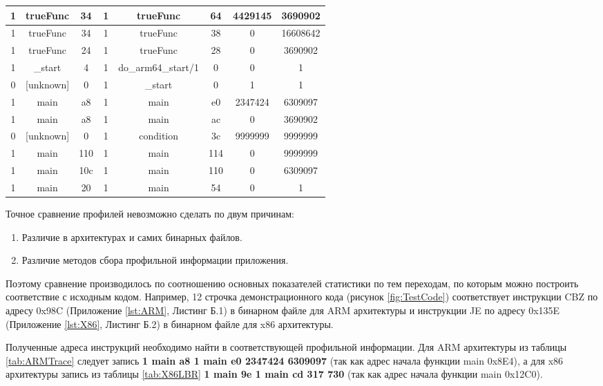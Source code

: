 \begin{table} [h]
\begin{threeparttable}
\begin{SingleSpace}
\begin{tabular}{| c | c | c | c | c | c | c | c |}
				1& trueFunc& 34& 1& trueFunc& 64& 4429145& 3690902 \\ \hline
				1& trueFunc& 34& 1& trueFunc& 38& 0& 16608642 \\ \hline
				1& trueFunc& 24& 1& trueFunc& 28& 0& 3690902 \\ \hline
				1& \_start& 4& 1& do\_arm64\_start/1& 0& 0& 1 \\ \hline
				0& [unknown]& 0& 1& \_start& 0& 1& 1 \\ \hline
				1& main& a8& 1& main& e0& 2347424& 6309097 \\ \hline
				1& main& a8& 1& main& ac& 0& 3690902 \\ \hline
				0& [unknown]& 0& 1& condition& 3c& 9999999& 9999999 \\ \hline
				1& main& 110& 1& main& 114& 0& 9999999 \\ \hline
				1& main& 10c& 1& main& 110& 0& 6309097 \\ \hline
				1& main& 20& 1& main& 54& 0& 1 \\ \hline
            \end{tabular}%
        \end{SingleSpace}
    \end{threeparttable}
\end{table}
	
Точное сравнение профилей невозможно сделать по двум причинам:
\begin{enumerate}[beginpenalty=10000]
  \item Различие в архитектурах и самих бинарных файлов.
  \item Различие методов сбора профильной информации приложения.
\end{enumerate}

Поэтому сравнение производилось по соотношению основных показателей статистики по тем переходам, по которым можно построить соответствие с исходным кодом. Например, 12 строчка демонстрационного кода (рисунок \cref{fig:TestCode}) соответствует инструкции CBZ по адресу 0x98C (Приложение \cref{lst:ARM}, Листинг Б.1) в бинарном файле для ARM архитектуры и инструкции JE по адресу 0x135E (Приложение \cref{lst:X86}, Листинг Б.2) в бинарном файле для x86 архитектуры.

Полученные адреса инструкций необходимо найти в соответствующей профильной информации. Для ARM архитектуры из таблицы \cref{tab:ARMTrace} следует запись \textbf{1 main a8 1 main e0 2347424 6309097} (так как адрес начала функции main 0x8E4), а для x86 архитектуры запись из таблицы \cref{tab:X86LBR} \textbf{1 main 9e 1 main cd 317 730} (так как адрес начала функции main 0x12C0).

